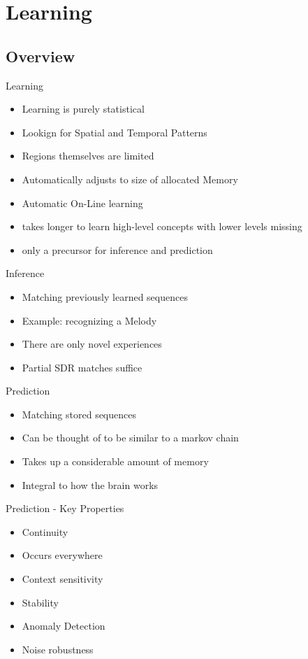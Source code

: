 \section{Learning}

\subsection{Overview}

\begin{frame}[c]{Learning}
    \begin{itemize}[<+(1)->]
        \item Learning is purely statistical
        \item Lookign for Spatial and Temporal Patterns
        \item Regions themselves are limited
        \item Automatically adjusts to size of allocated Memory
        \item Automatic On-Line learning
        \item takes longer to learn high-level concepts with lower levels missing
        \item only a precursor for inference and prediction
    \end{itemize}
\end{frame}


\begin{frame}[c]{Inference}
    \Large
    \begin{itemize}[<+(1)->]
        \item Matching previously learned sequences
        \item Example: recognizing a Melody
        \item There are only novel experiences
        \item Partial SDR matches suffice
    \end{itemize}
\end{frame}


\begin{frame}[c]{Prediction}
    \Large
    \begin{itemize}[<+(1)->]
        \item Matching stored sequences
        \item Can be thought of to be similar to a markov chain
        \item Takes up a considerable amount of memory
        \item Integral to how the brain works
    \end{itemize}
\end{frame}


\begin{frame}[c]{Prediction - Key Properties}
    \Large
    \begin{itemize}[<+(1)->]
        \item Continuity
        \item Occurs everywhere
        \item Context sensitivity
        \item Stability
        \item Anomaly Detection
        \item Noise robustness
    \end{itemize}
\end{frame}





